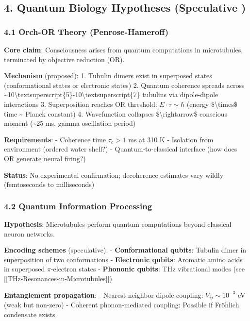 \subsection{4. Quantum Biology Hypotheses (Speculative
)}\label{quantum-biology-hypotheses-speculative}

\subsubsection{4.1 Orch-OR Theory
(Penrose-Hameroff)}\label{orch-or-theory-penrose-hameroff}

\textbf{Core claim}: Consciousness arises from quantum computations in
microtubules, terminated by objective reduction (OR).

\textbf{Mechanism} (proposed): 1. Tubulin dimers exist in superposed
states (conformational states or electronic states) 2. Quantum coherence
spreads across
\textasciitilde10\textbackslash textsuperscript\{5\}-10\textbackslash textsuperscript\{7\}
tubulins via dipole-dipole interactions 3. Superposition reaches OR
threshold: \(E \cdot \tau \sim \hbar\) (energy \$\textbackslash times\$
time \textasciitilde{} Planck constant) 4. Wavefunction collapses
\$\textbackslash rightarrow\$ conscious moment (\textasciitilde25 ms,
gamma oscillation period)

\textbf{Requirements}: - Coherence time \(\tau_c > 1\) ms at 310 K -
Isolation from environment (ordered water shell?) - Quantum-to-classical
interface (how does OR generate neural firing?)

\textbf{Status}: No experimental confirmation; decoherence estimates
vary wildly (femtoseconds to milliseconds)

\subsubsection{4.2 Quantum Information
Processing}\label{quantum-information-processing}

\textbf{Hypothesis}: Microtubules perform quantum computations beyond
classical neuron networks.

\textbf{Encoding schemes} (speculative): - \textbf{Conformational
qubits}: Tubulin dimer in superposition of two conformations -
\textbf{Electronic qubits}: Aromatic amino acids in superposed
\(\pi\)-electron states - \textbf{Phononic qubits}: THz vibrational
modes (see {[}{[}THz-Resonances-in-Microtubules{]}{]})

\textbf{Entanglement propagation}: - Nearest-neighbor dipole coupling:
\(V_{ij} \sim 10^{-3}\) eV (weak but non-zero) - Coherent
phonon-mediated coupling: Possible if Fröhlich condensate exists

